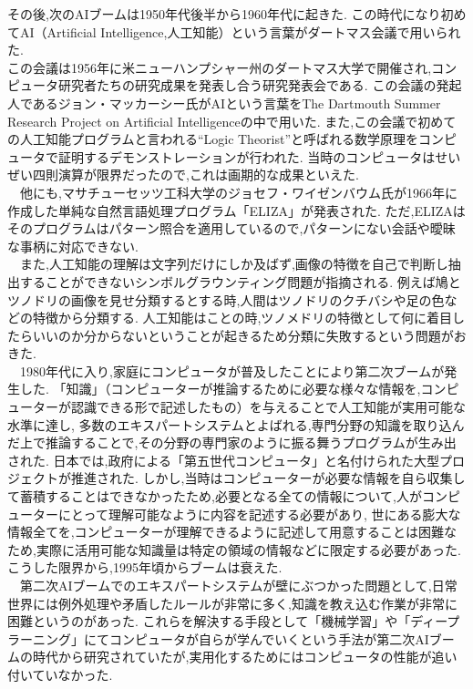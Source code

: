 \newpage
その後,次のAIブームは1950年代後半から1960年代に起きた.
この時代になり初めてAI（Artificial Intelligence,人工知能）という言葉がダートマス会議で用いられた.\\
この会議は1956年に米ニューハンプシャー州のダートマス大学で開催され,コンピュータ研究者たちの研究成果を発表し合う研究発表会である.
この会議の発起人であるジョン・マッカーシー氏がAIという言葉をThe Dartmouth Summer Research Project on Artificial Intelligence\cite{ronbun2}の中で用いた.
また,この会議で初めての人工知能プログラムと言われる“Logic Theorist”と呼ばれる数学原理をコンピュータで証明するデモンストレーションが行われた.
当時のコンピュータはせいぜい四則演算が限界だったので,これは画期的な成果といえた.\\
　他にも,マサチューセッツ工科大学のジョセフ・ワイゼンバウム氏が1966年に作成した単純な自然言語処理プログラム「ELIZA」が発表された.
ただ,ELIZAはそのプログラムはパターン照合を適用しているので,パターンにない会話や曖昧な事柄に対応できない.\\
　また,人工知能の理解は文字列だけにしか及ばず,画像の特徴を自己で判断し抽出することができないシンボルグラウンティング問題が指摘される.
例えば鳩とツノドリの画像を見せ分類するとする時,人間はツノドリのクチバシや足の色などの特徴から分類する.
人工知能はことの時,ツノメドリの特徴として何に着目したらいいのか分からないということが起きるため分類に失敗するという問題がおきた.\\
　1980年代に入り,家庭にコンピュータが普及したことにより第二次ブームが発生した.
「知識」（コンピューターが推論するために必要な様々な情報を,コンピューターが認識できる形で記述したもの）を与えることで人工知能が実用可能な水準に達し,
多数のエキスパートシステムとよばれる,専門分野の知識を取り込んだ上で推論することで,その分野の専門家のように振る舞うプログラムが生み出された.
日本では,政府による「第五世代コンピュータ」と名付けられた大型プロジェクトが推進された.
しかし,当時はコンピューターが必要な情報を自ら収集して蓄積することはできなかったため,必要となる全ての情報について,人がコンピューターにとって理解可能なように内容を記述する必要があり,
世にある膨大な情報全てを,コンピューターが理解できるように記述して用意することは困難なため,実際に活用可能な知識量は特定の領域の情報などに限定する必要があった.
こうした限界から,1995年頃からブームは衰えた.\\
　第二次AIブームでのエキスパートシステムが壁にぶつかった問題として,日常世界には例外処理や矛盾したルールが非常に多く,知識を教え込む作業が非常に困難というのがあった.
これらを解決する手段として「機械学習」や「ディープラーニング」にてコンピュータが自らが学んでいくという手法が第二次AIブームの時代から研究されていたが,実用化するためにはコンピュータの性能が追い付いていなかった.\\
